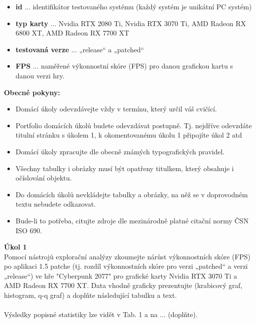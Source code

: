 \documentclass[a4paper,12pt]{article}
\begin{document}
\begin{itemize}
  \item \textbf{id} ... identifikátor testovaného systému (každý systém je unikátní PC systém)
  \item \textbf{typ karty} ... Nvidia RTX 2080 Ti, Nvidia RTX 3070 Ti, AMD Radeon RX 6800 XT, AMD Radeon RX
7700 XT
  \item  \textbf{testovaná verze} ... „release“ a „patched“
  \item \textbf{FPS} ... naměřené výkonnostní skóre (FPS) pro danou grafickou kartu s danou verzi hry.
\end{itemize}

\textbf{Obecné pokyny:}

\begin{itemize}
    \item Domácí úkoly odevzdávejte vždy v termínu, který určil váš cvičící.
    \item Portfolio domácích úkolů budete odevzdávat postupně. Tj. nejdříve odevzdáte titulní stránku
s úkolem 1, k okomentovanému úkolu 1 připojíte úkol 2 atd
    \item Domácí úkoly zpracujte dle obecně známých typografických pravidel. 
    \item Všechny tabulky i obrázky musí být opatřeny titulkem, který obsahuje i očíslování objektu.  
    \item Do domácích úkolů nevkládejte tabulky a obrázky, na něž se v doprovodném textu nebudete odkazovat.
    \item Bude-li to potřeba, citujte zdroje dle mezinárodně platné citační normy ČSN ISO 690.
\end{itemize}
\newpage
\textbf{Úkol 1}\\
Pomocí nástrojů explorační analýzy zkoumejte nárůst výkonnostních skóre (FPS) po aplikaci 1.5 patche
(tj. rozdíl výkonnostních skóre pro verzi „patched“ a verzi „release“) ve hře "Cyberpunk 2077" pro
grafické karty Nvidia RTX 3070 Ti a AMD Radeon RX 7700 XT. Data vhodně graficky prezentujte
(krabicový graf, histogram, q-q graf) a doplňte následující tabulku a text.\\\\
Výsledky popisné statistiky lze vidět v Tab. 1 a na ... (doplňte).
\end{document}

